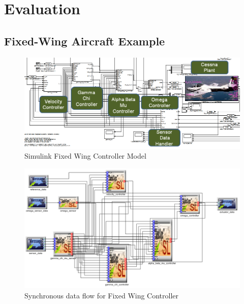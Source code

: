 \section{Evaluation}

\subsection{Fixed-Wing Aircraft Example}

\begin{figure}[htb]	
    \begin{center}
    \centerline{\includegraphics[width=\columnwidth]{figures/fixed_wing_controller_mdl.png}}
    \caption{Simulink Fixed Wing Controller Model}
    \label{fig:fw_simulink}
    \end{center}	
\end{figure}

\begin{figure}[htb]	
    \begin{center}
    \centerline{\includegraphics[width=\columnwidth]{figures/all_in_one}}
    \caption{Synchronous data flow for Fixed Wing Controller}
    \label{fig:sdfcontroller}
    \end{center}	
\end{figure}

